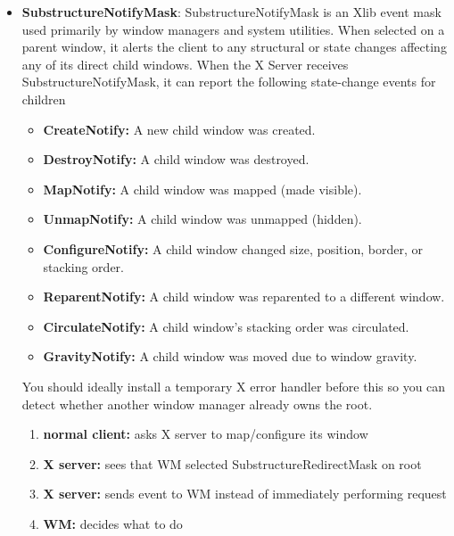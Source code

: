 \documentclass{report}
\begin{document}
\begin{itemize}
        \bigbreak \noindent 
        When this mask is set on a parent window (like the root window), it intercepts requests from other clients to map, configure (resize/move), or circulate child windows. Instead of executing the command, the X server pauses the action and sends the window manager a specific request even
    \item \textbf{SubstructureNotifyMask}: SubstructureNotifyMask is an Xlib event mask used primarily by window managers and system utilities. When selected on a parent window, it alerts the client to any structural or state changes affecting any of its direct child windows. 
        \bigbreak \noindent 
        When the X Server receives SubstructureNotifyMask, it can report the following state-change events for children
        \begin{itemize}
            \item \textbf{CreateNotify:} A new child window was created.
            \item \textbf{DestroyNotify:} A child window was destroyed.
            \item \textbf{MapNotify:} A child window was mapped (made visible).
            \item \textbf{UnmapNotify:} A child window was unmapped (hidden).
            \item \textbf{ConfigureNotify:} A child window changed size, position, border, or stacking order.
            \item \textbf{ReparentNotify:} A child window was reparented to a different window.
            \item \textbf{CirculateNotify:} A child window's stacking order was circulated.
            \item \textbf{GravityNotify:} A child window was moved due to window gravity. 
        \end{itemize}
        You should ideally install a temporary X error handler before this so you can detect whether another window manager already owns the root.
        \bigbreak \noindent 
        \begin{enumerate}
            \item \textbf{normal client:} asks X server to map/configure its window
            \item \textbf{X server:} sees that WM selected SubstructureRedirectMask on root
            \item \textbf{X server:} sends event to WM instead of immediately performing request
            \item \textbf{WM:} decides what to do

\end{enumerate}
\end{itemize}
\end{document}
